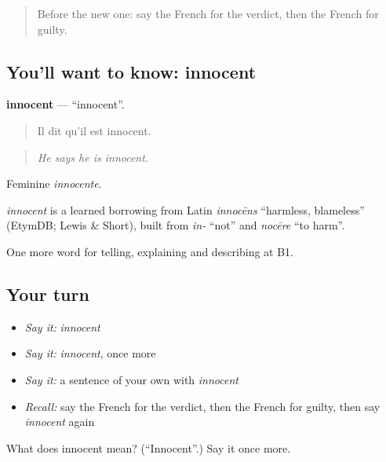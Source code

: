 \label{lesson:FR-C387-innocent}



\begin{quote}
Before the new one: say the French for the verdict, then the French for guilty.
\end{quote}

\subsection*{You'll want to know: innocent}
\textbf{innocent} — \textquotedblleft{}innocent\textquotedblright{}.

\begin{quote}
Il dit qu'il est innocent.
\end{quote}

\begin{quote}
\emph{He says he is innocent.}
\end{quote}

Feminine \emph{innocente}.

\begin{cousinweb}
\emph{innocent} is a learned borrowing from Latin \emph{innocēns} \textquotedblleft{}harmless, blameless\textquotedblright{} (EtymDB; Lewis \& Short), built from \emph{in-} \textquotedblleft{}not\textquotedblright{} and \emph{nocēre} \textquotedblleft{}to harm\textquotedblright{}.
\end{cousinweb}

\begin{grammarlens}[title={What you've built}]
One more word for telling, explaining and describing at B1.
\end{grammarlens}

\subsection*{Your turn}
\begin{itemize}
\raggedright
  \item \emph{Say it:} \emph{innocent}
  \item \emph{Say it:} \emph{innocent}, once more
  \item \emph{Say it:} a sentence of your own with \emph{innocent}
  \item \emph{Recall:} say the French for the verdict, then the French for guilty, then say \emph{innocent} again
\end{itemize}

\begin{tcolorbox}[breakable,colback=teal!4,colframe=teal!35!black,title={Before you move on}]
What does innocent mean? (\textquotedblleft{}Innocent\textquotedblright{}.) Say it once more.
\end{tcolorbox}
